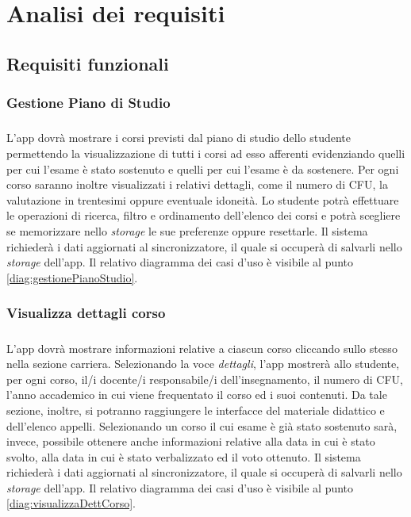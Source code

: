 
\chapter{Analisi dei requisiti}
\label{ref:requisiti1}

\section{Requisiti funzionali}

\subsection{Gestione Piano di Studio}
\paragraph{} 
L’app dovrà mostrare i corsi previsti dal piano di studio dello studente permettendo la visualizzazione di tutti i corsi ad esso afferenti evidenziando quelli per cui l’esame è stato sostenuto e quelli per cui l’esame è da sostenere. Per ogni corso saranno inoltre visualizzati i relativi dettagli, come il numero di CFU, la valutazione in trentesimi oppure eventuale idoneità. Lo studente potrà effettuare le operazioni di ricerca, filtro e ordinamento dell'elenco dei corsi e potrà scegliere se memorizzare nello \textit{storage} le sue preferenze oppure resettarle. Il sistema richiederà i dati aggiornati al sincronizzatore, il quale si occuperà di salvarli nello \textit{storage} dell’app.
Il relativo diagramma dei casi d'uso è visibile al punto \ref{diag:gestionePianoStudio}.

\subsection{Visualizza dettagli corso}
\paragraph{} 
L’app dovrà mostrare informazioni relative a ciascun corso cliccando sullo stesso nella sezione carriera. Selezionando la voce \textit{dettagli}, l’app mostrerà allo studente, per ogni corso, il/i docente/i responsabile/i dell’insegnamento, il numero di CFU, l’anno accademico in cui viene frequentato il corso ed i suoi contenuti. Da tale sezione, inoltre, si potranno raggiungere le interfacce del materiale didattico e dell’elenco appelli. Selezionando un corso il cui esame è già stato sostenuto sarà, invece, possibile ottenere anche informazioni relative alla data in cui è stato svolto, alla data in cui è stato verbalizzato ed il voto ottenuto. Il sistema richiederà i dati aggiornati al sincronizzatore, il quale si occuperà di salvarli nello \textit{storage} dell’app.
Il relativo diagramma dei casi d'uso è visibile al punto \ref{diag:visualizzaDettCorso}.

